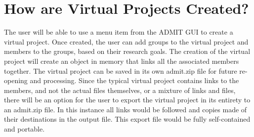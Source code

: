 \documentclass[11pt,twoside]{article}
\begin{document}
\section{How are Virtual Projects Created?}
The user will be able to use a menu item from the ADMIT GUI to create a virtual project. Once created, the user can add groups to the virtual project and members to the groups, based on their research goals. The creation of the virtual project will create an object in memory that links all the associated members together. The virtual project can be saved in its own admit.zip file for future re-opening and processing. Since the typical virtual project contains links to the members, and not the actual files themselves, or a mixture of links and files, there will be an option for the user to export the virtual project in its entirety to an admit.zip file. In this instance all links would be followed and copies made of their destinations in the output file. This export file would be fully self-contained and portable.


\end{document}
